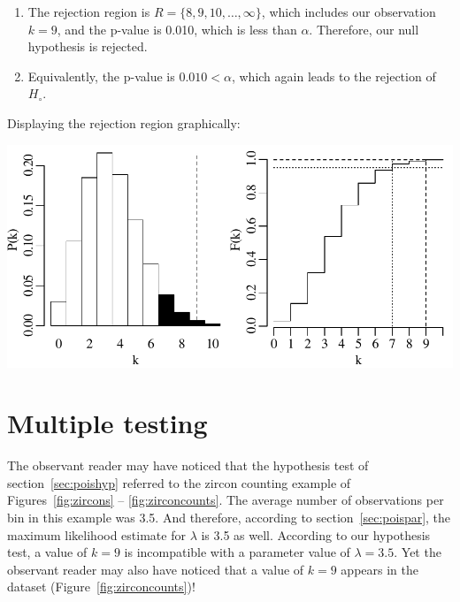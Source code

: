 \begin{enumerate}
\item\label{it:poisl351sided} The rejection region is $R =
  \{8,9,10,\ldots,\infty\}$, which includes our observation $k=9$,
  and the p-value is 0.010, which is less than $\alpha$. Therefore,
  our null hypothesis is rejected.

\item Equivalently, the p-value is $0.010<\alpha$, which again leads
  to the rejection of $H_\circ$.

\end{enumerate}

Displaying the rejection region graphically:

\noindent\begin{minipage}[t][][b]{.6\textwidth}
  \includegraphics[width=\textwidth]{../figures/poishyp.pdf}\\
\end{minipage}
\begin{minipage}[t][][t]{.4\textwidth}
  \label{fig:poishyp}
\end{minipage}

\section{Multiple testing}
\label{sec:multipletesting}

The observant reader may have noticed that the hypothesis test of
section~\ref{sec:poishyp} referred to the zircon counting example of
Figures~\ref{fig:zircons} -- \ref{fig:zirconcounts}. The average
number of observations per bin in this example was 3.5. And therefore,
according to section~\ref{sec:poispar}, the maximum likelihood
estimate for $\lambda$ is 3.5 as well. According to our hypothesis
test, a value of $k=9$ is incompatible with a parameter value of
$\lambda=3.5$. Yet the observant reader may also have noticed that a
value of $k=9$ appears in the dataset
(Figure~\ref{fig:zirconcounts})!\\

